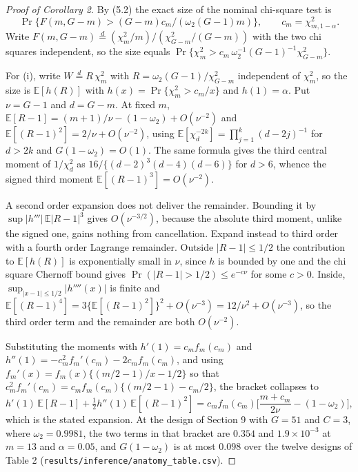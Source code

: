 \documentclass[12pt]{article}
\theoremstyle{definition}
\numberwithin{equation}{section}
\begin{document}
\begin{proof}[Proof of Corollary 2]
By (5.2) the exact size of the nominal chi-square test is
\[
\Pr\{F(m,G-m) > (G-m)c_m / (\omega_2(G-1)m)\},
\qquad c_m = \chi^2_{m,1-\alpha}.
\]
Write $F(m,G-m) \overset{d}{=} (\chi^2_m/m) /
(\chi^2_{G-m}/(G-m))$ with the two chi squares independent, so the size equals
$\Pr\{\chi^2_m > c_m \,\omega_2^{-1}(G-1)^{-1}\chi^2_{G-m}\}$.

For (i), write $W \overset{d}{=} R\,\chi^2_m$ with $R = \omega_2 (G-1)/
\chi^2_{G-m}$ independent of $\chi^2_m$, so the size is $\mathbb{E}[h(R)]$ with
$h(x) = \Pr\{\chi^2_m > c_m/x\}$ and $h(1) = \alpha$. Put $\nu = G-1$ and
$d = G-m$. At fixed $m$, $\mathbb{E}[R-1] = (m+1)/\nu - (1-\omega_2) +
O(\nu^{-2})$ and $\mathbb{E}[(R-1)^2] = 2/\nu + O(\nu^{-2})$, using
$\mathbb{E}[\chi_d^{-2k}] = \prod_{j=1}^{k}(d-2j)^{-1}$ for $d > 2k$ and
$G(1-\omega_2) = O(1)$. The same formula gives the third central moment of
$1/\chi^2_d$ as $16/\{(d-2)^3(d-4)(d-6)\}$ for $d > 6$, whence the signed third
moment $\mathbb{E}[(R-1)^3] = O(\nu^{-2})$.

A second order expansion does not deliver the remainder. Bounding it by
$\sup|h'''|\,\mathbb{E}|R-1|^3$ gives $O(\nu^{-3/2})$, because the absolute
third moment, unlike the signed one, gains nothing from cancellation. Expand
instead to third order with a fourth order Lagrange remainder. Outside
$|R-1| \le 1/2$ the contribution to $\mathbb{E}[h(R)]$ is exponentially small in
$\nu$, since $h$ is bounded by one and the chi square Chernoff bound gives
$\Pr(|R-1| > 1/2) \le e^{-c\nu}$ for some $c>0$. Inside,
$\sup_{|x-1| \le 1/2}|h''''(x)|$ is finite and $\mathbb{E}[(R-1)^4] =
3\{\mathbb{E}[(R-1)^2]\}^2 + O(\nu^{-3}) = 12/\nu^2 + O(\nu^{-3})$, so the
third order term and the remainder are both $O(\nu^{-2})$.

Substituting the moments with $h'(1) = c_m f_m(c_m)$ and $h''(1) =
-c_m^2 f_m'(c_m) - 2 c_m f_m(c_m)$, and using $f_m'(x) = f_m(x)
\{(m/2-1)/x - 1/2\}$ so that $c_m^2 f_m'(c_m) = c_m f_m(c_m)
\{(m/2-1) - c_m/2\}$, the bracket collapses to
$$
h'(1)\,\mathbb{E}[R-1] + \tfrac{1}{2}h''(1)\,\mathbb{E}[(R-1)^2]
= c_m f_m(c_m)\Big[\frac{m+c_m}{2\nu} - (1-\omega_2)\Big],
$$
which is the stated expansion. At the design of Section 9 with
$G = 51$ and $C = 3$, where $\omega_2 = 0.9981$, the two terms in that bracket
are $0.354$ and $1.9 \times 10^{-3}$ at $m = 13$ and $\alpha = 0.05$, and
$G(1-\omega_2)$ is at most $0.098$ over the twelve designs of Table
2
(\texttt{results/inference/anatomy\_table.csv}).


\end{proof}
\end{document}
